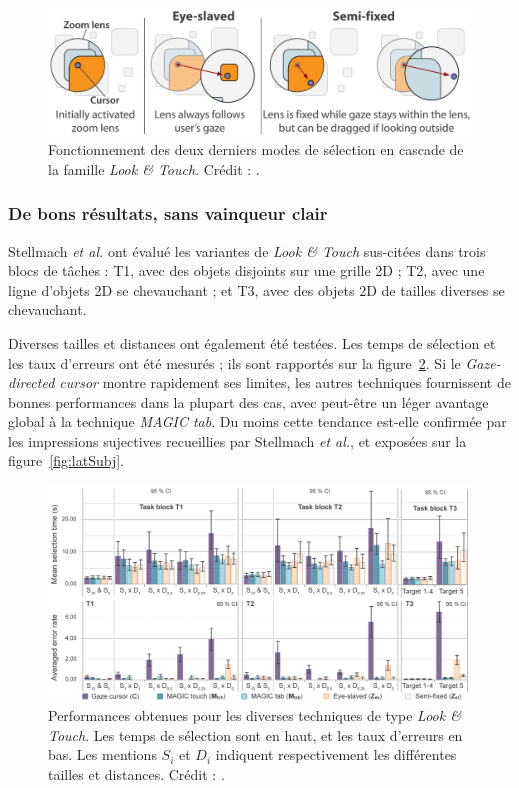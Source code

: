 	\begin{figure}[htb]
		\centering
		\includegraphics[width=\textwidth]{figures/ch2/lookandtouch2}
		\caption[\emph{Look \&{} Touch -- principe II}]{Fonctionnement des deux derniers modes de sélection en cascade de la famille \emph{Look \&{} Touch}. Crédit : \cite{stellmach2012look}.}
		\label{fig:lookandtouch2}
	\end{figure}
	
	\subsubsection{De bons résultats, sans vainqueur clair}
	Stellmach \emph{et al.} ont évalué les variantes de \emph{Look \&{} Touch} sus-citées dans trois blocs de tâches : T1, avec des objets disjoints sur une grille 2D ; T2, avec une ligne d'objets 2D se chevauchant ; et T3, avec des objets 2D de tailles diverses se chevauchant.
	
	Diverses tailles et distances ont également été testées. Les temps de sélection et les taux d'erreurs ont été mesurés ; ils sont rapportés sur la figure~\ref{fig:latRes}. Si le \emph{Gaze-directed cursor} montre rapidement ses limites, les autres techniques fournissent de bonnes performances dans la plupart des cas, avec peut-être un léger avantage global à la technique \emph{MAGIC tab}. Du moins cette tendance est-elle confirmée par les impressions sujectives recueillies par Stellmach \emph{et al.}, et exposées sur la figure~\ref{fig:latSubj}.

	\begin{figure}[htb]
		\centering
		\includegraphics[width=\textwidth]{figures/ch2/latRes}
		\caption[\emph{Look \&{} Touch -- performances}]{Performances obtenues pour les diverses techniques de type \emph{Look \&{} Touch}. Les temps de sélection sont en haut, et les taux d'erreurs en bas. Les mentions $S_{i}$ et $D_{i}$ indiquent respectivement les différentes tailles et distances. Crédit : \cite{stellmach2012look}.}
		\label{fig:latRes}
	\end{figure}
	
